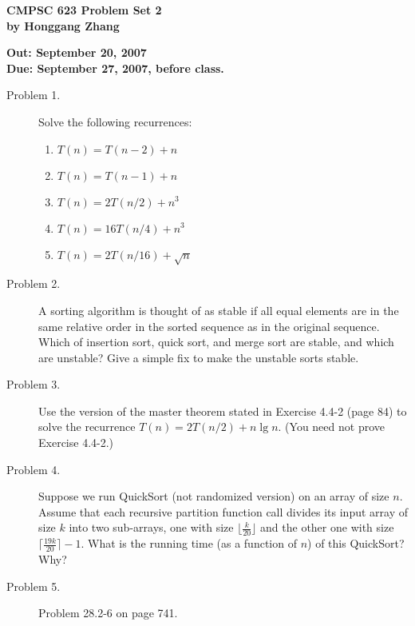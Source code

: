\documentclass[11pt]{article}
\begin{document}

\begin{center}
{\bf CMPSC 623 Problem Set 2} \\
{\bf by Honggang Zhang} \\
\end{center}
\begin{center}
{\bf Out: September 20, 2007} \\
{\bf Due: September 27, 2007, before class.} \\

\end{center}

\begin{description}

\item[Problem 1.] Solve the following recurrences:
\begin{enumerate}
\item $T(n)=T(n-2)+n$
\item $T(n)=T(n-1) + n$
\item $T(n)=2T(n/2)+n^3$
\item $T(n)=16T(n/4)+n^3$
\item $T(n)=2T(n/16)+\sqrt{n}$
\end{enumerate}

\item[Problem 2.] A sorting algorithm is thought of as stable if all
equal elements are in the same relative order in the sorted sequence as in the original sequence.
Which of insertion sort, quick sort, and merge sort are stable, and which are unstable? Give a
simple fix to make the unstable sorts stable.

\item[Problem 3.] Use the version of the master theorem stated in
Exercise 4.4-2 (page 84) to solve the recurrence $T(n)=2T(n/2)+n\lg n$. (You need not prove
Exercise 4.4-2.)

\item[Problem 4.] Suppose we run QuickSort (not randomized version) on an array of size $n$.
Assume that each recursive partition function call divides its input array of size $k$ into two
sub-arrays, one with size $\lfloor \frac{k}{20} \rfloor$ and the other one with size
$\lceil\frac{19k}{20}\rceil-1$. What is the running time (as a function of $n$) of this QuickSort?
Why?

\item[Problem 5.]Problem 28.2-6 on page 741.


\end{description}
\end{document}
